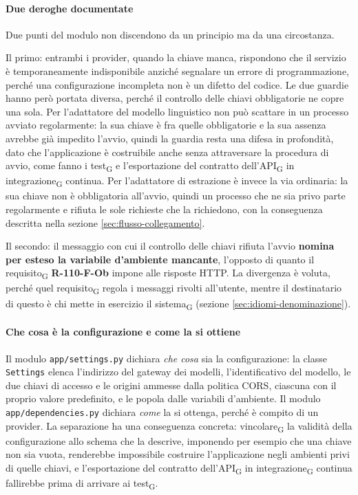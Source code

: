 \documentclass[a4paper, 10pt]{article}
\begin{document}
\paragraph{Due deroghe documentate}
Due punti del modulo non discendono da un principio ma da una circostanza.

Il primo: entrambi i provider, quando la chiave manca, rispondono che il servizio è temporaneamente indisponibile anziché segnalare un errore di programmazione, perché una configurazione incompleta non è un difetto del codice. Le due guardie hanno però portata diversa, perché il controllo delle chiavi obbligatorie ne copre una sola. Per l'adattatore del modello linguistico non può scattare in un processo avviato regolarmente: la sua chiave è fra quelle obbligatorie e la sua assenza avrebbe già impedito l'avvio, quindi la guardia resta una difesa in profondità, dato che l'applicazione è costruibile anche senza attraversare la procedura di avvio, come fanno i test\textsubscript{G} e l'esportazione del contratto dell'API\textsubscript{G} in integrazione\textsubscript{G} continua. Per l'adattatore di estrazione è invece la via ordinaria: la sua chiave non è obbligatoria all'avvio, quindi un processo che ne sia privo parte regolarmente e rifiuta le sole richieste che la richiedono, con la conseguenza descritta nella sezione \ref{sec:flusso-collegamento}.

Il secondo: il messaggio con cui il controllo delle chiavi rifiuta l'avvio \textbf{nomina per esteso la variabile d'ambiente mancante}, l'opposto di quanto il requisito\textsubscript{G} \textbf{R-110-F-Ob} impone alle risposte HTTP. La divergenza è voluta, perché quel requisito\textsubscript{G} regola i messaggi rivolti all'utente, mentre il destinatario di questo è chi mette in esercizio il sistema\textsubscript{G} (sezione \ref{sec:idiomi-denominazione}).

\paragraph{Che cosa è la configurazione e come la si ottiene}
Il modulo \texttt{app/settings.py} dichiara \textit{che cosa} sia la configurazione: la classe \texttt{Settings} elenca l'indirizzo del gateway dei modelli, l'identificativo del modello, le due chiavi di accesso e le origini ammesse dalla politica CORS, ciascuna con il proprio valore predefinito, e le popola dalle variabili d'ambiente. Il modulo \texttt{app/dependencies.py} dichiara \textit{come} la si ottenga, perché è compito di un provider. La separazione ha una conseguenza concreta: vincolare\textsubscript{G} la validità della configurazione allo schema che la descrive, imponendo per esempio che una chiave non sia vuota, renderebbe impossibile costruire l'applicazione negli ambienti privi di quelle chiavi, e l'esportazione del contratto dell'API\textsubscript{G} in integrazione\textsubscript{G} continua fallirebbe prima di arrivare ai test\textsubscript{G}.
\end{document}
